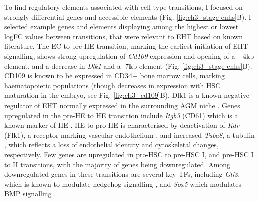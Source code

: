 To find regulatory elements associated with cell type transitions, I focused on strongly differential genes and accessible elements (Fig. \ref{fig:ch3_stage-enhs}B). I selected example genes and elements displaying among the highest or lowest logFC values between transitions, that were relevant to EHT based on known literature. The EC to pre-HE transition, marking the earliest initiation of EHT signalling, shows strong upregulation of \textit{Cd109} expression and opening of a +4kb element, and a decrease in \textit{Dlk1} and a -7kb element (Fig. \ref{fig:ch3_stage-enhs}B). CD109 is known to be expressed in CD34+ bone marrow cells, marking haematopoietic populations \citep{murray_cd109_1999} (though decreases in expression with HSC maturation in the embryo, see Fig. \ref{fig:ch3_cd109}B). Dlk1 is a known negative regulator of EHT normally expressed in the surrounding AGM niche \citep{mirshekar-syahkal_dlk1_2013}. Genes upregulated in the pre-HE to HE transition include \textit{Itgb3} (CD61) which is a known marker of HE \citep{huang_generation_2016}. HE to pro-HE is characterised by deactivation of \textit{Kdr} (Flk1), a receptor marking vascular endothelium \citep{millauer_high_1993}, and increased \textit{Tuba8}, a tubulin \citep{stanchi_tuba8_2000}, which reflects a loss of endothelial identity and cytoskeletal changes, respectively. Few genes are upregulated in pro-HSC to pre-HSC I, and pre-HSC I to II transitions, with the majority of genes being downregulated. Among downregulated genes in these transitions are several key TFs, including \textit{Gli3}, which is known to modulate hedgehog signalling \citep{chaudhry_gli3_2017}, and \textit{Sox5} which modulates BMP signalling \citep{nordin_sox5_2014}.

